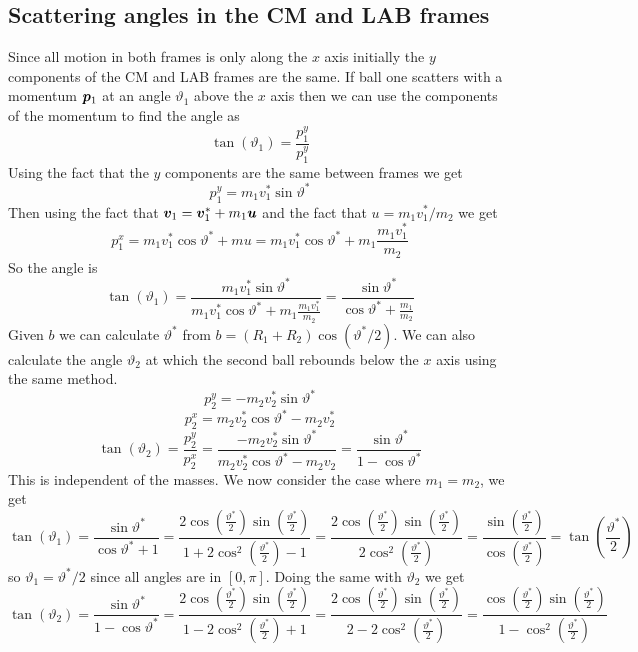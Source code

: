 \documentclass{article}
\begin{document}
    \subsection{Scattering angles in the CM and LAB frames}
    Since all motion in both frames is only along the \(x\) axis initially the \(y\) components of the CM and LAB frames are the same.
    If ball one scatters with a momentum \(\bm{p}_1\) at an angle \(\vartheta_1\) above the \(x\) axis then we can use the components of the momentum to find the angle as
    \[\tan(\vartheta_1) = \frac{p_1^y}{p_1^y}\]
    Using the fact that the \(y\) components are the same between frames we get
    \[p_1^y = m_1v_1^*\sin\vartheta^*\]
    Then using the fact that \(\bm{v}_1 = \bm{v}_1^* + m_1\bm{u}\) and the fact that \(u = m_1v_1^*/m_2\) we get
    \[p_1^x = m_1v_1^*\cos\vartheta^* + mu = m_1v_1^*\cos\vartheta^* + m_1\frac{m_1v_1^*}{m_2}\]
    So the angle is
    \[\tan(\vartheta_1) = \frac{m_1v_1^*\sin\vartheta^*}{m_1v_1^*\cos\vartheta^* + m_1\frac{m_1v_1^*}{m_2}} = \frac{\sin\vartheta^*}{\cos\vartheta^* + \frac{m_1}{m_2}}\]
    Given \(b\) we can calculate \(\vartheta^*\) from \(b = (R_1 + R_2)\cos(\vartheta^*/2)\).
    We can also calculate the angle \(\vartheta_2\) at which the second ball rebounds below the \(x\) axis using the same method.
    \[p_2^y = -m_2v_2^*\sin\vartheta^*\]
    \[p_2^x = m_2v_2^*\cos\vartheta^* - m_2v_2^*\]
    \[\tan(\vartheta_2) = \frac{p_2^y}{p_2^x} = \frac{-m_2v_2^*\sin\vartheta^*}{m_2v_2^*\cos\vartheta^* - m_2v_2} = \frac{\sin\vartheta^*}{1 - \cos\vartheta^*}\]
    This is independent of the masses.
    We now consider the case where \(m_1 = m_2\), we get
    \[\tan(\vartheta_1) = \frac{\sin\vartheta^*}{\cos\vartheta^* + 1} = \frac{2\cos\left(\!\frac{\vartheta^*}{2}\!\right)\sin\left(\!\frac{\vartheta^*}{2}\!\right)}{1 + 2\cos^2\left(\!\frac{\vartheta^*}{2}\!\right) - 1} = \frac{2\cos\left(\!\frac{\vartheta^*}{2}\!\right)\sin\left(\!\frac{\vartheta^*}{2}\!\right)}{2\cos^2\left(\!\frac{\vartheta^*}{2}\!\right)} = \frac{\sin\left(\!\frac{\vartheta^*}{2}\!\right)}{\cos\left(\!\frac{\vartheta^*}{2}\!\right)} = \tan\left(\frac{\vartheta^*}{2}\right)\]
    so \(\vartheta_1 = \vartheta^*/2\) since all angles are in \([0, \pi]\).
    Doing the same with  \(\vartheta_2\) we get
    \[\tan(\vartheta_2) = \frac{\sin\vartheta^*}{1 - \cos\vartheta^*} = \frac{2\cos\left(\!\frac{\vartheta^*}{2}\!\right)\sin\left(\!\frac{\vartheta^*}{2}\!\right)}{1 - 2\cos^2\left(\!\frac{\vartheta^*}{2}\!\right) + 1} = \frac{2\cos\left(\!\frac{\vartheta^*}{2}\!\right)\sin\left(\!\frac{\vartheta^*}{2}\!\right)}{2 - 2\cos^2\left(\!\frac{\vartheta^*}{2}\!\right)} = \frac{\cos\left(\!\frac{\vartheta^*}{2}\!\right)\sin\left(\!\frac{\vartheta^*}{2}\!\right)}{1 - \cos^2\left(\!\frac{\vartheta^*}{2}\!\right)}\] 
\end{document}
